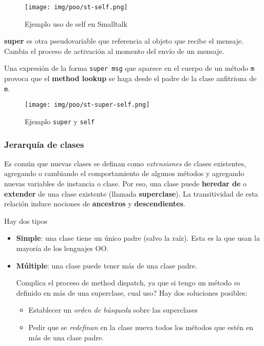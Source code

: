 \documentclass{report}
\theoremstyle{definition} %
\begin{document}
\begin{figure}[H]
    \centering
    \texttt{[image: img/poo/st-self.png]}
    \caption{Ejemplo uso de self en Smalltalk}
\end{figure}

\textbf{super} es otra pseudovariable que referencia al objeto que recibe el
mensaje. Cambia el proceso de activación al momento del envío de un mensaje.

Una expresión de la forma \texttt{super msg} que aparece en el cuerpo de un
método \texttt{m} provoca que el \textbf{method lookup} se haga desde el padre
de la clase anfitriona de \texttt{m}.

\begin{figure}[H]
    \centering
    \texttt{[image: img/poo/st-super-self.png]}
    \caption{Ejemplo \texttt{super} y \texttt{self}}
\end{figure}

\subsubsection{Jerarquía de clases}

Es común que nuevas clases se definan como \textit{extensiones} de clases
existentes, agregando o cambiando el comportamiento de algunos métodos y
agregando nuevas variables de instancia o clase. Por eso, una clase puede
\textbf{heredar de} o \textbf{extender} de una clase existente (llamada
\textbf{superclase}). La transitividad de esta relación induce nociones de
\textbf{ancestros} y \textbf{descendientes}.

Hay dos tipos

\begin{itemize}
    \item \textbf{Simple}: una clase tiene un único padre (salvo la raíz). Esta
    es la que usan la mayoría de los lenguajes OO.
    \item \textbf{Múltiple}: una clase puede tener más de una clase padre.
    
    Complica el proceso de method dispatch, ya que si tengo un método $m$
    definido en más de una superclase, cual uso? Hay dos soluciones posibles:
    \begin{itemize}
        \item Establecer un \textit{orden de búsqueda} sobre las superclases
        \item Pedir que se \textit{redefinan} en la clase nueva todos los
        métodos que estén en más de una clase padre.
    \end{itemize}
    
\end{itemize}
\end{document}
